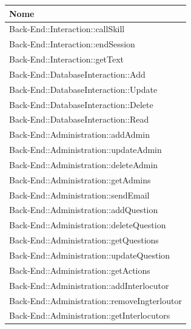 \documentclass[../DefinizioneDiProdotto.tex]{subfiles}
\begin{document}
	\begin{longtable}[c] { >{\centering\arraybackslash}p{10cm} }
				\toprule
				\centerline{\textbf{Nome}} \\
				\midrule
				Back-End::Interaction::callSkill  \\
		 		\addlinespace[0.3em]
				\midrule
				Back-End::Interaction::endSession  \\
		 		\addlinespace[0.3em]
				\midrule
				Back-End::Interaction::getText  \\
		 		\addlinespace[0.3em]
				\midrule
				Back-End::DatabaseInteraction::Add  \\
		 		\addlinespace[0.3em]
				\midrule
				Back-End::DatabaseInteraction::Update  \\
		 		\addlinespace[0.3em]
				\midrule
				Back-End::DatabaseInteraction::Delete \\
		 		\addlinespace[0.3em]
				\midrule
				Back-End::DatabaseInteraction::Read  \\
		 		\addlinespace[0.3em]
				\midrule
				Back-End::Administration::addAdmin  \\
		 		\addlinespace[0.3em]
				\midrule
				Back-End::Administration::updateAdmin  \\
		 		\addlinespace[0.3em]
				\midrule
				Back-End::Administration::deleteAdmin \\
		 		\addlinespace[0.3em]
				\midrule
				Back-End::Administration::getAdmins  \\
		 		\addlinespace[0.3em]
				\midrule
				Back-End::Administration::sendEmail  \\
		 		\addlinespace[0.3em]
				\midrule
				Back-End::Administration::addQuestion \\
		 		\addlinespace[0.3em]
				\midrule
				Back-End::Administration::deleteQuestion  \\
		 		\addlinespace[0.3em]
				\midrule
				Back-End::Administration::getQuestions  \\
		 		\addlinespace[0.3em]
				\midrule
				Back-End::Administration::updateQuestion \\
		 		\addlinespace[0.3em]
				\midrule
				Back-End::Administration::getActions  \\
		 		\addlinespace[0.3em]
				\midrule
				Back-End::Administration::addInterlocutor  \\
		 		\addlinespace[0.3em]
				\midrule
				Back-End::Administration::removeIngterloutor  \\
		 		\addlinespace[0.3em]
				\midrule
				Back-End::Administration::getInterlocutors  \\

\end{longtable}
\end{document}
